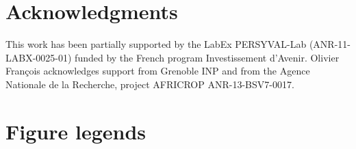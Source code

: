 \documentclass{article}
\begin{document}
\pagestyle{empty}

\newpage 







\section*{Acknowledgments} 

This work has been partially supported by the LabEx PERSYVAL-Lab (ANR-11-LABX-0025-01) funded by the French program
Investissement d\rq{}Avenir. Olivier Fran\c cois acknowledges support from Grenoble INP and from the Agence Nationale de la Recherche, project AFRICROP ANR-13-BSV7-0017.


\newpage 







\clearpage
\newpage






\clearpage
\newpage

\section*{Figure legends}



\vspace{1cm}

\end{document}
